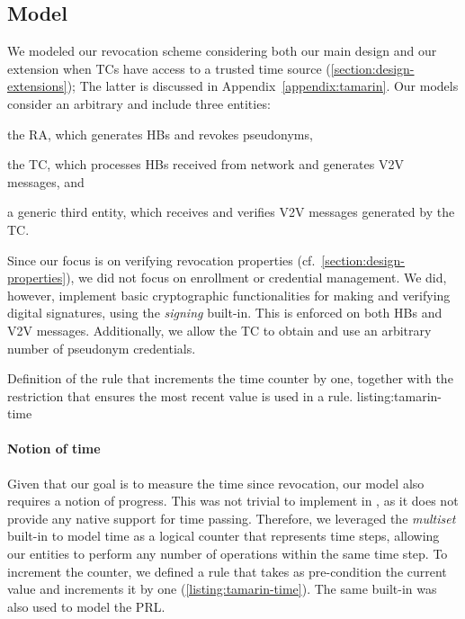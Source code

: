 \subsection{Model}
\label{section:tamarin-model}

We modeled our revocation scheme considering both our main design and our
extension when \acp{TC} have access to a trusted time source
(\cref{section:design-extensions}); The latter is discussed in
Appendix~\ref{appendix:tamarin}. Our models consider an arbitrary \paramtt{} and
include three entities: %
%
\begin{paraenum}
    \item the \ac{RA}, which generates \acp{HB} and revokes pseudonyms,
    \item the \ac{TC}, which processes \acp{HB} received from network and
    generates \ac{V2V} messages, and
    \item a generic third entity, which receives and verifies \ac{V2V} messages
    generated by the \ac{TC}.
\end{paraenum}
%
Since our focus is on verifying revocation properties
(cf.~\cref{section:design-properties}), we did not focus on enrollment or
credential management. We did, however, implement basic cryptographic
functionalities for making and verifying digital signatures, using the
\emph{signing} built-in. This is enforced on both \acp{HB} and \ac{V2V}
messages. Additionally, we allow the \ac{TC} to obtain and use an arbitrary
number of pseudonym credentials.

%
  {Definition of the  rule that increments the
  time counter by one, together with the  restriction
  that ensures the most recent value is used in a rule.}%
  {listing:tamarin-time} 

\paragraph{Notion of time}
%
Given that our goal is to measure the time since revocation, our model also
requires a notion of progress. This was not trivial to implement in \tamarin, as
it does not provide any native support for time passing. Therefore, we leveraged
the \emph{multiset} built-in to model time as a logical counter that represents
time steps, allowing our entities to perform any number of operations within the
same time step. To increment the counter, we defined a rule that takes as
pre-condition the current value and increments it by one
(\cref{listing:tamarin-time}). The same built-in was also used to model the
\ac{PRL}.

